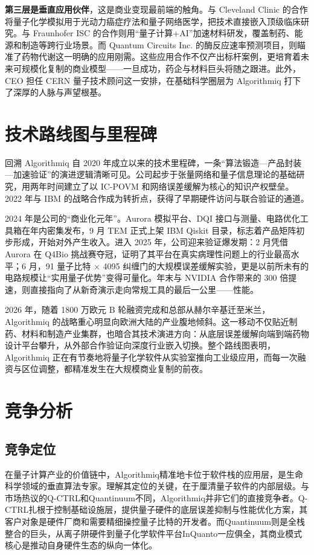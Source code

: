 \documentclass[11pt,a4paper]{ctexart}
\begin{document}
\textbf{第三层是垂直应用伙伴}，这是商业变现最前端的触角。与 Cleveland Clinic 的合作将量子化学模拟用于光动力癌症疗法和量子网络医学，把技术直接嵌入顶级临床研究。与 Fraunhofer ISC 的合作则用“量子计算+AI”加速材料研发，覆盖制药、能源和制造等跨行业场景。而 Quantum Circuits Inc. 的酶反应速率预测项目，则瞄准了药物代谢这一明确的应用刚需。这些应用合作不仅产出标杆案例，更培育着未来可规模化复制的商业模型——一旦成功，药企与材料巨头将随之跟进。此外，CEO 担任 CERN 量子技术顾问这一安排，在基础科学圈层为 Algorithmiq 打下了深厚的人脉与声望根基。

\section{技术路线图与里程碑}
回溯 Algorithmiq 自 2020 年成立以来的技术里程碑，一条“算法锻造—产品封装—加速验证”的演进逻辑清晰可见。公司起步于张量网络和量子信息理论的基础研究，用两年时间建立了以 IC-POVM 和网络误差缓解为核心的知识产权壁垒。2022 年与 IBM 的战略合作成为转折点，获得了早期硬件访问与联合验证的通道。

2024 年是公司的“商业化元年”。Aurora 模拟平台、DQI 接口与测量、电路优化工具箱在年内密集发布，9 月 TEM 正式上架 IBM Qiskit 目录，标志着产品矩阵初步形成，开始对外产生收入。进入 2025 年，公司迎来验证爆发期：2 月凭借 Aurora 在 Q4Bio 挑战赛夺冠，证明了其平台在真实病理性问题上的行业最高水平；6 月，91 量子比特 × 4095 纠缠门的大规模误差缓解实验，更是以前所未有的电路规模让“实用量子优势”变得可量化。年末与 NVIDIA 合作带来的 300 倍提速，则直接指向了从新奇演示走向常规工具的最后一公里——性能。

2026 年，随着 1800 万欧元 B 轮融资完成和总部从赫尔辛基迁至米兰，Algorithmiq 的战略重心明显向欧洲大陆的产业腹地倾斜。这一移动不仅贴近制药、材料和制造产业集群，也暗合其技术演进方向：从底层误差缓解向端到端药物设计平台攀升，从外部合作验证向深度行业嵌入切换。整个路线图表明，Algorithmiq 正在有节奏地将量子化学软件从实验室推向工业级应用，而每一次融资与区位调整，都精准发生在大规模商业复制的前夜。

\section{竞争分析}
\subsection{竞争定位}

在量子计算产业的价值链中，Algorithmiq精准地卡位于软件栈的应用层，是生命科学领域的垂直算法专家。理解其定位的关键，在于厘清量子软件的内部层级。与市场热议的Q-CTRL和Quantinuum不同，Algorithmiq并非它们的直接竞争者。Q-CTRL扎根于控制基础设施层，提供量子硬件的底层误差抑制与性能优化方案，其客户对象是硬件厂商和需要精细操控量子比特的开发者。而Quantinuum则是全栈整合的巨头，从离子阱硬件到量子化学软件平台InQuanto一应俱全，其商业模式核心是推动自身硬件生态的纵向一体化。
\end{document}
